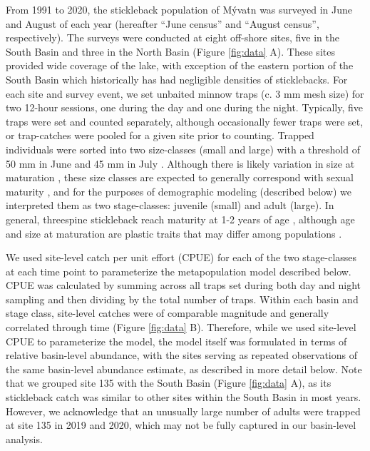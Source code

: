 \documentclass[11pt]{article}
\begin{document}
From 1991 to 2020, 
the stickleback population of M\'{y}vatn was surveyed in June and August of each year
(hereafter ``June census'' and ``August census'', respectively). 
The surveys were conducted at eight off-shore sites, 
five in the South Basin and three in the North Basin
(Figure \ref{fig:data} A).
These sites provided wide coverage of the lake,
with exception of the eastern portion of the South Basin 
which historically has had negligible densities of sticklebacks.
For each site and survey event, 
we set unbaited minnow traps (c. 3 mm mesh size) for two 12-hour sessions, 
one during the day and one during the night. 
Typically, five traps were set and counted separately, 
although occasionally fewer traps were set,
or trap-catches were pooled for a given site prior to counting.
Trapped individuals were sorted into two size-classes (small and large)
with a threshold of 50 mm in June and 45 mm in July \citep{gislason1998}. 
Although there is likely variation in size at maturation \citep{singkam2019},
these size classes are expected to generally correspond with sexual maturity 
\citep{gudmundsson1996, gislason1998},
and for the purposes of demographic modeling (described below) 
we interpreted them as two stage-classes: juvenile (small) and adult (large).
In general, threespine stickleback reach maturity at 1-2 years of age
\citep{baker2008overview},
although age and size at maturation are plastic traits \citep{baker2015life}
that may differ among populations \citep{snyder1991migration}.

We used site-level catch per unit effort (CPUE) for each of the two stage-classes 
at each time point to parameterize the metapopulation model described below. 
CPUE was calculated by summing across all traps set during both day and night sampling
and then dividing by the total number of traps.
Within each basin and stage class, 
site-level catches were of comparable magnitude and 
generally correlated through time (Figure \ref{fig:data} B).
Therefore, while we used site-level CPUE to parameterize the model, 
the model itself was formulated in terms of relative basin-level abundance,
with the sites serving as repeated observations of the same basin-level abundance estimate,
as described in more detail below.
Note that we grouped site 135 with the South Basin (Figure \ref{fig:data} A), 
as its stickleback catch was similar to other sites within the South Basin in most years.
However, 
we acknowledge that an unusually large number of adults were trapped at site 135
in 2019 and 2020, which may not be fully captured in our basin-level analysis.
\end{document}
